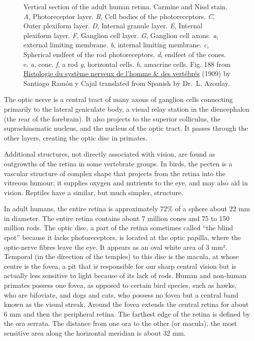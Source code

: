 \begin{figure}
{}

\caption{Vertical section of the adult human retina. Carmine and Nissl stain. \emph{A}, Photoreceptor layer. \emph{B}, Cell bodies of the photoreceptors. \emph{C}, Outer plexiform layer. \emph{D}, Internal granule layer. \emph{E}, Internal plexiform layer. \emph{F}, Ganglion cell layer. \emph{G}, Ganglion cell axons. \emph{a}, external limiting membrane. \emph{b}, internal limiting membrane. \emph{c}, Spherical endfeet of the rod photoreceptors. \emph{d}, endfeet of the cones. e. \emph{a}, cone. \emph{f}, a rod \emph{g}, horizontal cells. \emph{h}, amacrine cells. Fig. 188 from \href{https://wellcomelibrary.org/item/b2129592x\#?c=0\&m=0\&s=0\&cv=0\&z=-0.9137\%2C-0.0887\%2C2.8274\%2C1.7747}{Histologie du système nerveux de l'homme \& des vertébrés} (1909) by Santiago Ramón y Cajal translated from Spanish by Dr.~L. Azoulay.}\label{fig:retcajal}
\end{figure}

The optic nerve is a central tract of many axons of ganglion cells connecting primarily to the lateral geniculate body, a visual relay station in the diencephalon (the rear of the forebrain). It also projects to the superior colliculus, the suprachiasmatic nucleus, and the nucleus of the optic tract. It passes through the other layers, creating the optic disc in primates.

Additional structures, not directly associated with vision, are found as outgrowths of the retina in some vertebrate groups. In birds, the pecten is a vascular structure of complex shape that projects from the retina into the vitreous humour; it supplies oxygen and nutrients to the eye, and may also aid in vision. Reptiles have a similar, but much simpler, structure.

In adult humans, the entire retina is approximately 72\% of a sphere about 22 mm in diameter. The entire retina contains about 7 million cones and 75 to 150 million rods. The optic disc, a part of the retina sometimes called ``the blind spot'' because it lacks photoreceptors, is located at the optic papilla, where the optic-nerve fibres leave the eye. It appears as an oval white area of 3 mm². Temporal (in the direction of the temples) to this disc is the macula, at whose centre is the fovea, a pit that is responsible for our sharp central vision but is actually less sensitive to light because of its lack of rods. Human and non-human primates possess one fovea, as opposed to certain bird species, such as hawks, who are bifoviate, and dogs and cats, who possess no fovea but a central band known as the visual streak. Around the fovea extends the central retina for about 6 mm and then the peripheral retina. The farthest edge of the retina is defined by the ora serrata. The distance from one ora to the other (or macula), the most sensitive area along the horizontal meridian is about 32 mm.

